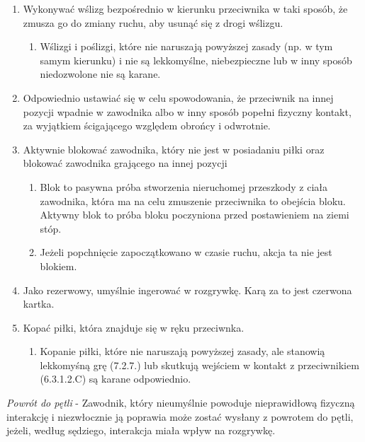 \documentclass[12pt]{article}
\begin{document}
\begin{enumerate}
	\item
	      Wykonywać wślizg bezpośrednio w kierunku przeciwnika w taki sposób, że
	      zmusza go do zmiany ruchu, aby usunąć się z drogi wślizgu.

	      \begin{enumerate}
		      \item
		            Wślizgi i poślizgi, które nie naruszają powyższej zasady (np. w tym
		            samym kierunku) i nie są lekkomyślne, niebezpieczne lub w inny
		            sposób niedozwolone nie są karane.
	      \end{enumerate}
	\item
	      Odpowiednio ustawiać się w celu spowodowania, że przeciwnik na innej
	      pozycji wpadnie w zawodnika albo w inny sposób popełni fizyczny
	      kontakt, za wyjątkiem ścigającego względem obrońcy i odwrotnie.
	\item
	      Aktywnie blokować zawodnika, który nie jest w posiadaniu piłki oraz
	      blokować zawodnika grającego na innej pozycji

	      \begin{enumerate}
		      \item
		            Blok to pasywna próba stworzenia nieruchomej przeszkody z ciała
		            zawodnika, która ma na celu zmuszenie przeciwnika to obejścia bloku.
		            Aktywny blok to próba bloku poczyniona przed postawieniem na ziemi
		            stóp.
		      \item
		            Jeżeli popchnięcie zapoczątkowano w czasie ruchu, akcja ta nie jest
		            blokiem.
	      \end{enumerate}
	\item
	      Jako rezerwowy, umyślnie ingerować w rozgrywkę. Karą za to jest
	      czerwona kartka.
	\item
	      Kopać piłki, która znajduje się w ręku przeciwnka.

	      \begin{enumerate}
		      \item
		            Kopanie piłki, które nie naruszają powyższej zasady, ale stanowią
		            lekkomyśną grę (7.2.7.) lub skutkują wejściem w kontakt z
		            przeciwnikiem (6.3.1.2.C) są karane odpowiednio.
	      \end{enumerate}
\end{enumerate}

\emph{Powrót do pętli} - Zawodnik, który nieumyślnie powoduje
nieprawidłową fizyczną interakcję i niezwłocznie ją poprawia może zostać
wysłany z powrotem do pętli, jeżeli, według sędziego, interakcja miała
wpływ na rozgrywkę.
\end{document}
